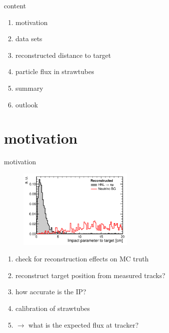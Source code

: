 



\maketitle


\begin{frame}[t]{content}
  \begin{enumerate} \setlength\itemsep{0.5cm}
    \item {\Large motivation}
    \item {\Large data sets}
    \item {\Large reconstructed distance to target}
    \item {\Large particle flux in strawtubes}
    \item {\Large summary}
    \item {\Large outlook}
  \end{enumerate}
\end{frame}

\section{motivation}

\begin{frame}[t]{motivation}
  \begin{multicols}{2}
    \begin{figure}
      \centering
      \includegraphics[width=0.5\textwidth]{fig/IP_cut.png}
    \end{figure}
    \columnbreak
    \vspace*{\fill}
      \begin{enumerate}
        \item check for reconstruction effects on MC truth
        \item reconstruct target position from measured tracks?
        \item how accurate is the IP?
        \item calibration of strawtubes
        \item $\rightarrow$ what is the expected flux at tracker?
      \end{enumerate}
    \vspace*{\fill}
  \end{multicols}
\end{frame}

